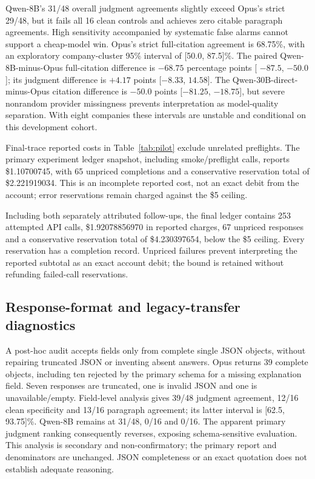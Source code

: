 \documentclass[11pt]{article}
\begin{document}
Qwen-8B's 31/48 overall judgment agreements slightly exceed Opus's strict 29/48, but it fails all 16 clean controls and achieves zero citable paragraph agreements. High sensitivity accompanied by systematic false alarms cannot support a cheap-model win. Opus's strict full-citation agreement is 68.75\%, with an exploratory company-cluster 95\% interval of [50.0, 87.5]\%. The paired Qwen-8B-minus-Opus full-citation difference is $-68.75$ percentage points [ $-87.5$, $-50.0$ ]; its judgment difference is $+4.17$ points [$-8.33$, $14.58$]. The Qwen-30B-direct-minus-Opus citation difference is $-50.0$ points [$-81.25$, $-18.75$], but severe nonrandom provider missingness prevents interpretation as model-quality separation. With eight companies these intervals are unstable and conditional on this development cohort.

Final-trace reported costs in Table~\ref{tab:pilot} exclude unrelated preflights. The primary experiment ledger snapshot, including smoke/preflight calls, reports \$1.10700745, with 65 unpriced completions and a conservative reservation total of \$2.221919034. This is an incomplete reported cost, not an exact debit from the account; error reservations remain charged against the \$5 ceiling.

Including both separately attributed follow-ups, the final ledger contains 253 attempted API calls, \$1.92078856970 in reported charges, 67 unpriced responses and a conservative reservation total of \$4.230397654, below the \$5 ceiling. Every reservation has a completion record. Unpriced failures prevent interpreting the reported subtotal as an exact account debit; the bound is retained without refunding failed-call reservations.

\subsection{Response-format and legacy-transfer diagnostics}
A post-hoc audit accepts fields only from complete single JSON objects, without repairing truncated JSON or inventing absent answers. Opus returns 39 complete objects, including ten rejected by the primary schema for a missing explanation field. Seven responses are truncated, one is invalid JSON and one is unavailable/empty. Field-level analysis gives 39/48 judgment agreement, 12/16 clean specificity and 13/16 paragraph agreement; its latter interval is [62.5, 93.75]\%. Qwen-8B remains at 31/48, 0/16 and 0/16. The apparent primary judgment ranking consequently reverses, exposing schema-sensitive evaluation. This analysis is secondary and non-confirmatory; the primary report and denominators are unchanged. JSON completeness or an exact quotation does not establish adequate reasoning.
\end{document}
